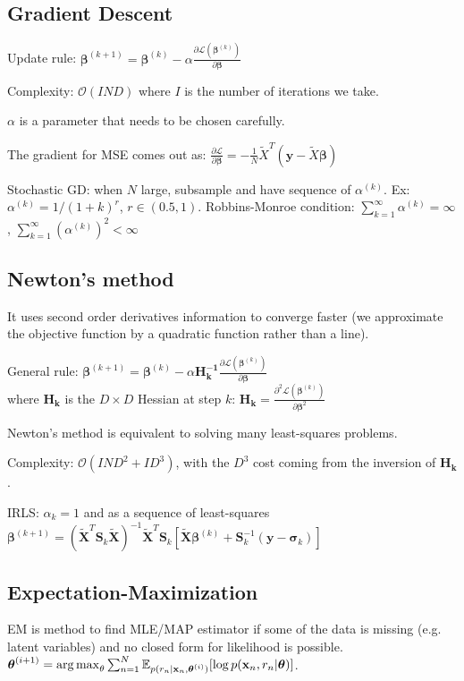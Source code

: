 \documentclass[10pt,a4paper,landscape]{extarticle}
\renewcommand{\bf}[1]{\ensuremath{\mathbf{#1}}}
\newcommand{\bbeta}{\boldsymbol\beta}
\newcommand{\btheta}{\boldsymbol\theta}
\begin{document}
\begin{multicols*}{4}
\subsection{Gradient Descent}
Update rule: $\bbeta^{(k+1)} = \bbeta^{(k)} - \alpha \frac{\partial \mathcal{L}(\bbeta^{(k)})}{\partial \bbeta}$

Complexity: $\mathcal{O}(I N D)$ where $I$ is the number of iterations we take.

$\alpha$ is a parameter that needs to be chosen carefully.

The gradient for MSE comes out as:
$\frac{\partial \mathcal{L}}{\partial \bbeta} = - \frac{1}{N} \tilde{X}^T ( \boldsymbol y - \tilde{X} \bbeta )$

Stochastic GD: when $N$ large, subsample and have sequence of $\alpha^{(k)}$. Ex: $\alpha^{(k)} = 1 / (1 + k)^r$, $r \in (0.5, 1)$. Robbins-Monroe condition: $\sum_{k=1}^\infty \alpha^{(k)} = \infty$, $\sum_{k=1}^\infty (\alpha^{(k)})^2 < \infty$

\subsection{Newton's method}
It uses second order derivatives information to converge faster (we approximate the objective function by a quadratic function rather than a line).

General rule: $\bbeta^{(k+1)} = \bbeta^{(k)} - \alpha \bf{H_k^{-1}} \frac{\partial \mathcal{L}(\bbeta^{(k)})}{\partial \bbeta}$\\
where $\bf{H_k}$ is the $D \times D$ Hessian at step $k$: $\bf{H_k} = \frac{\partial^2 \mathcal{L}(\bbeta^{(k)})}{\partial \bbeta^2}$

Newton's method is equivalent to solving many least-squares problems.

Complexity: $\mathcal{O}(I N D^2 + I D^3)$, with the $D^3$ cost coming from the inversion of $\bf{H_k}$.

IRLS: $\alpha_k = 1$ and as a sequence of least-squares $\bbeta^{(k+1)} = (\tilde{\bf{X}}^T \bf{S}_k \tilde{\bf{X}})^{-1} \tilde{\bf{X}}^T \bf{S}_k 
[\tilde{\bf{X}} \bbeta^{(k)} + \bf{S}_k^{-1} (\bf{y} - \bf{\sigma}_k)]$

\subsection{Expectation-Maximization}
EM is method to find MLE/MAP estimator if some of the data is missing (e.g. latent variables) and no closed form for likelihood is possible. $\btheta^{(i+1)} = \argmax_{\theta} \sum _{n=1}^N \mathbb{E}_{p(r_n | \bf{x}_n , \btheta^{(i)})} [\log p(\bf{x}_n , r_n | \btheta)]$.


\end{multicols*}
\end{document}
